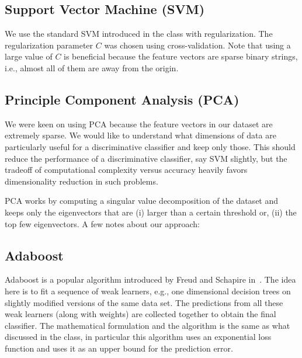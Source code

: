 \documentclass[11pt, letterpaper, conference, final, twocolumn]{ieeeconf}
\begin{document}
\subsection{Support Vector Machine (SVM)}
\label{ssec:svm}

We use the standard SVM introduced in the class with regularization. The regularization parameter $C$ was chosen using cross-validation. Note that using a large value of $C$ is beneficial because the feature vectors are sparse binary strings, i.e., almost all of them are away from the origin. 

\subsection{Principle Component Analysis (PCA)}
\label{ssec:pca}

We were keen on using PCA because the feature vectors in our dataset are extremely sparse. We would like to understand what dimensions of data are particularly useful for a discriminative classifier and keep only those. This should reduce the performance of a discriminative classifier, say SVM slightly, but the tradeoff of computational complexity versus accuracy heavily favors dimensionality reduction in such problems.

PCA works by computing a singular value decomposition of the dataset and keeps only the eigenvectors that are (i) larger than a certain threshold or, (ii) the top few eigenvectors. A few notes about our approach:


\subsection{Adaboost}
\label{ssec:adaboost}
%
Adaboost is a popular algorithm introduced by Freud and Schapire in~\cite{freund1999short}. The idea here is to fit a sequence of weak learners, e.g., one dimensional decision trees on slightly modified versions of the same data set. The predictions from all these weak learners (along with weights) are collected together to obtain the final classifier. The mathematical formulation and the algorithm is the same as what discussed in the class, in particular this algorithm uses an exponential loss function and uses it as an upper bound for the prediction error.
\end{document}

